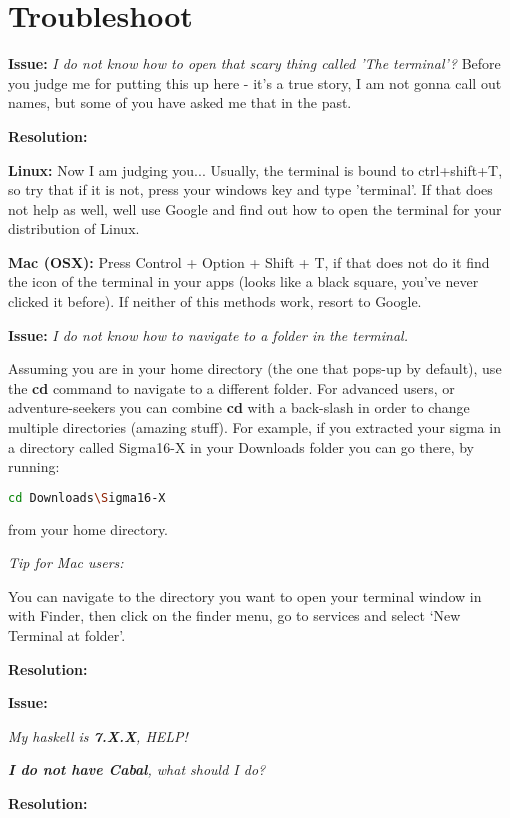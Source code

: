 \documentclass[11pt,a4paper]{article}
\begin{document}
\section{Troubleshoot}

\textbf{Issue:} \textit{I do not know how to open that scary thing called 'The terminal'?} Before you judge me for putting this up here - it's a true story, I am not gonna call out names, but some of you have asked me that in the past.

\textbf{Resolution:}

\textbf{Linux:}
Now I am judging you... Usually, the terminal is bound to ctrl+shift+T, so try that if it is not, press your windows key and type 'terminal'. If that does not help as well, well use Google and find out how to open the terminal for your distribution of Linux.

\textbf{Mac (OSX):}
Press Control + Option + Shift + T, if that does not do it find the icon of the terminal in your apps (looks like a black square, you've never clicked it before). If neither of this methods work, resort to Google.


\textbf{Issue:} \textit{I do not know how to navigate to a folder in the terminal.}

Assuming you are in your home directory (the one that pops-up by default), use the \textbf{cd} command to navigate to a different folder. For advanced users, or adventure-seekers you can combine \textbf{cd} with a back-slash in order to change multiple directories (amazing stuff). For example, if you extracted your sigma in a directory called Sigma16-X in your Downloads folder you can go there, by running:

\begin{lstlisting}[language=Bash]
cd Downloads\Sigma16-X
\end{lstlisting}
from your home directory.

\textit{Tip for Mac users:}

You can navigate to the directory you want to open your terminal window in with Finder, then click on the finder menu, go to services and select `New Terminal at folder'.

\textbf{Resolution:}
 

 \textbf{Issue:}
 
\textit{ My haskell is \textbf{7.X.X}, HELP!}
 
\textit{ \textbf{I do not have Cabal}, what should I do?}

\textbf{Resolution:}
 
\end{document}
